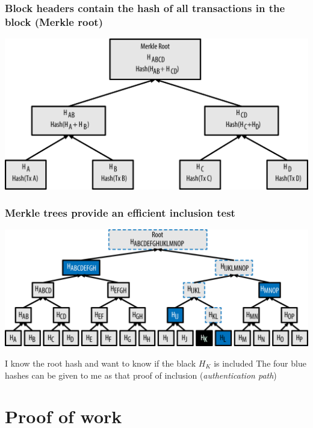 \documentclass[11pt]{beamer}  %
\begin{document}
\begin{frame}\frametitle{Block headers contain the hash of all transactions in the block (Merkle root)}

  \begin{center}
    \includegraphics[width=\textwidth,clip=false]{pictures/mbc2_0902.png}
  \end{center}

\end{frame}

\begin{frame}\frametitle{Merkle trees provide an efficient inclusion test}

  \begin{center}
    \includegraphics[width=\textwidth,clip=false]{pictures/mbc2_0905.png}
  \end{center}

  \begin{greenbox}{I know the root hash and want to know if the {\color{black}black $H_K$} is included}
    The {\color{blue}four blue hashes} can be given to me as that proof of inclusion
    (\emph{authentication path})
  \end{greenbox}

\end{frame}

\section{Proof of work}
\end{document}
